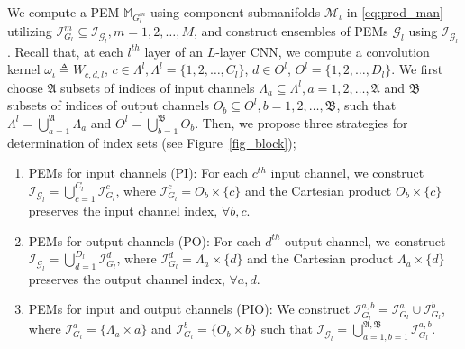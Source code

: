 \documentclass[10pt,journal,compsoc]{IEEEtran}
\theoremstyle{definition}
\theoremstyle{definition}
\theoremstyle{remark}
\theoremstyle{remark}
\theoremstyle{remark}
\begin{document}
We compute a PEM $\mathbb{M}_{G^m_l}$ using component submanifolds $\mathcal{M}_{\iota}$ in \eqref{eq:prod_man} utilizing ${\mathcal{I}_{{G}_l}^m \subseteq \mathcal{I}_{\mathcal{G}_l}}, m=1,2,\ldots,M$, and construct ensembles of PEMs $\mathcal{G}_l$ using $\mathcal{I}_{\mathcal{G}_l}$. Recall that, at each $l^{th}$ layer of an {$L$-layer} CNN, we compute a convolution kernel ${\omega_{\iota} \triangleq W_{c,d,l}}$, ${c \in \Lambda^l},  \Lambda^l=\{1,2,\ldots,C_l\}$, ${d \in O^l}$, $O^l=\{1,2,\ldots,D_l \}$. We first choose $\mathfrak{A}$ subsets of indices of input channels ${\Lambda_a \subseteq \Lambda^l}, a=1,2,\ldots,\mathfrak{A}$ and $\mathfrak{B}$ subsets of indices of output channels $O_b \subseteq O^l, b=1,2,\ldots,\mathfrak{B}$, such that $\Lambda^l = \bigcup \limits _{a=1} ^\mathfrak{A} \Lambda_a$ and $O^l = \bigcup \limits _{b=1} ^\mathfrak{B} O_b$. Then, we propose three strategies for determination of index sets (see Figure~\ref{fig_block});
\begin{enumerate}[leftmargin=*] %
	\item PEMs for input channels (PI): For each $c^{th}$ input channel, we construct $\mathcal{I}_{\mathcal{G}_l} = \bigcup \limits _{c=1} ^{C_l} \mathcal{I}_{{G}_l} ^c   $, where  ${\mathcal{I}_{{G}_l} ^c =  O_b \times \{c\} }$ and the Cartesian product ${O_b \times \{c\}} $ preserves the input channel index, $\forall b,c$. 	
	\item PEMs for output channels (PO): For each $d^{th}$ output channel, we construct $\mathcal{I}_{\mathcal{G}_l} = \bigcup \limits _{d=1} ^{D_l} \mathcal{I}_{{G}_l} ^d  $, where   ${\mathcal{I}_{{G}_l} ^d = \Lambda_a \times \{d\}  }$ and the Cartesian product $\Lambda_a \times \{d\} $ preserves the output channel index, $\forall a,d$. 	
	\item PEMs for input and output channels (PIO):  We construct $\mathcal{I}_{{G}_l}^{a,b} =  \mathcal{I}_{{G}_l}^{a} \cup  \mathcal{I}_{{G}_l}^{b}$, where $ \mathcal{I}_{{G}_l}^{a} = \{ \Lambda_a \times a \}$ and $ {\mathcal{I}_{{G}_l}^{b} = \{ O_b \times b\} }$  such that $\mathcal{I}_{\mathcal{G}_l} = \bigcup \limits _{a=1, b=1} ^{\mathfrak{A},\mathfrak{B}} \mathcal{I}_{{G}_l} ^{a,b}$.	
\end{enumerate} 
\end{document}
